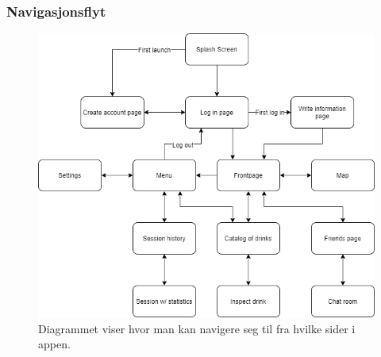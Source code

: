\subsubsection{Navigasjonsflyt}
\begin{figure}[H]
    \centering
    \includegraphics[scale=0.5]{images/lille_promille_float_diagram.drawio.png}
    \caption{Diagrammet viser hvor man kan navigere seg til fra hvilke sider i appen.}
\end{figure}

